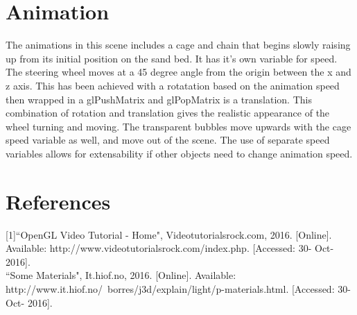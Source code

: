 \documentclass[]{article}
\begin{document}
\section{Animation}
The animations in this scene includes a cage and chain that begins slowly raising up from its initial position on the sand bed. It has it's own variable for speed. The steering wheel moves at a 45 degree angle from the origin between the x and z axis. This has been achieved with a rotatation based on the animation speed then wrapped in a glPushMatrix and glPopMatrix is a translation. This combination of rotation and translation gives the realistic appearance of the wheel turning and moving. The transparent bubbles move upwards with the cage speed variable as well, and move out of the scene. The use of separate speed variables allows for extensability if other objects need to change animation speed. 

\section*{References}

[1]``OpenGL Video Tutorial - Home", Videotutorialsrock.com, 2016. [Online].\newline
\hspace*{1cm} Available: http://www.videotutorialsrock.com/index.php. [Accessed: 30- Oct- 2016]. \\

\noindent
[2]``Some Materials", It.hiof.no, 2016. [Online]. Available: \newline \hspace*{1cm} http://www.it.hiof.no/~borres/j3d/explain/light/p-materials.html. [Accessed: 30- Oct- 2016].


\nocite{*}

\end{document}
